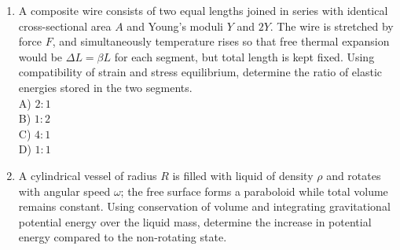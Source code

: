 \documentclass[12pt]{article}
\begin{document}
\begin{enumerate}
A) \(\dfrac{R}{\sqrt{gR}}\dfrac{\alpha}{1-\alpha^2}\)\\

B) \(\dfrac{R}{\sqrt{gR}}\dfrac{\alpha}{\sqrt{1-\alpha^2}}\)\\

C) \(\dfrac{R}{\sqrt{gR}}\dfrac{\alpha}{(1-\alpha^2)^{3/2}}\)\\

D) \(\dfrac{R}{\sqrt{gR}}\dfrac{1}{1-\alpha^2}\)

\item A composite wire consists of two equal lengths joined in series with identical cross-sectional area \(A\) and Young’s moduli \(Y\) and \(2Y\). The wire is stretched by force \(F\), and simultaneously temperature rises so that free thermal expansion would be \(\Delta L=\beta L\) for each segment, but total length is kept fixed. Using compatibility of strain and stress equilibrium, determine the ratio of elastic energies stored in the two segments.\\

A) \(2:1\)\\

B) \(1:2\)\\

C) \(4:1\)\\

D) \(1:1\)

\item A cylindrical vessel of radius \(R\) is filled with liquid of density \(\rho\) and rotates with angular speed \(\omega\); the free surface forms a paraboloid while total volume remains constant. Using conservation of volume and integrating gravitational potential energy over the liquid mass, determine the increase in potential energy compared to the non-rotating state.\\

\begin{center}
\end{center}
\end{enumerate}
\end{document}
